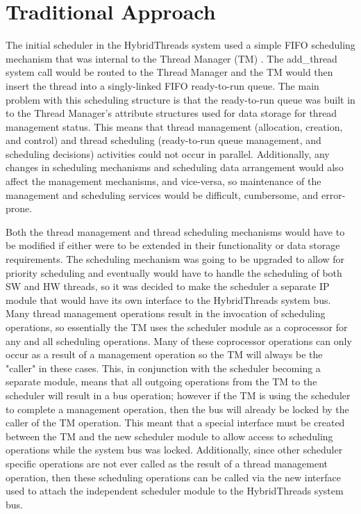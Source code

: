 \section{Traditional Approach} The initial scheduler in
the HybridThreads system used a simple FIFO scheduling mechanism that was
internal to the Thread Manager (TM) \cite{Andrews:2004wu}.  The add\_thread
system call would be routed to the Thread Manager and the TM would then insert
the thread into a singly-linked FIFO ready-to-run queue.  The main problem with
this scheduling structure is that the ready-to-run queue was built in to the
Thread Manager's attribute structures used for data storage for thread
management status.  This means that thread management (allocation, creation,
and control) and thread scheduling (ready-to-run queue management, and
scheduling decisions) activities could not occur in parallel.  Additionally,
any changes in scheduling mechanisms and scheduling data arrangement would also
affect the management mechanisms, and vice-versa, so maintenance of the
management and scheduling services would be difficult, cumbersome, and
error-prone.

Both the thread management and thread scheduling mechanisms would have to be
modified if either were to be extended in their functionality or data storage
requirements.  The scheduling mechanism was going to be upgraded to allow for
priority scheduling and eventually would have to handle the scheduling of both
SW and HW threads, so it was decided to make the scheduler a separate IP module
that would have its own interface to the HybridThreads system bus.  Many thread
management operations result in the invocation of scheduling operations, so
essentially the TM uses the scheduler module as a coprocessor for any and all
scheduling operations.  Many of these coprocessor operations can only occur as
a result of a management operation so the TM will always be the "caller" in
these cases.  This, in conjunction with the scheduler becoming a separate
module, means that all outgoing operations from the TM to the scheduler will
result in a bus operation; however if the TM is using the scheduler to complete
a management operation, then the bus will already be locked by the caller of
the TM operation.  This meant that a special interface must be
created between the TM and the new scheduler module to allow access to
scheduling operations while the system bus was locked.  Additionally, since
other scheduler specific operations are not ever called as the result of a thread
management operation, then these scheduling operations can be called via the
new interface used to attach the independent scheduler module to the
HybridThreads system bus.

